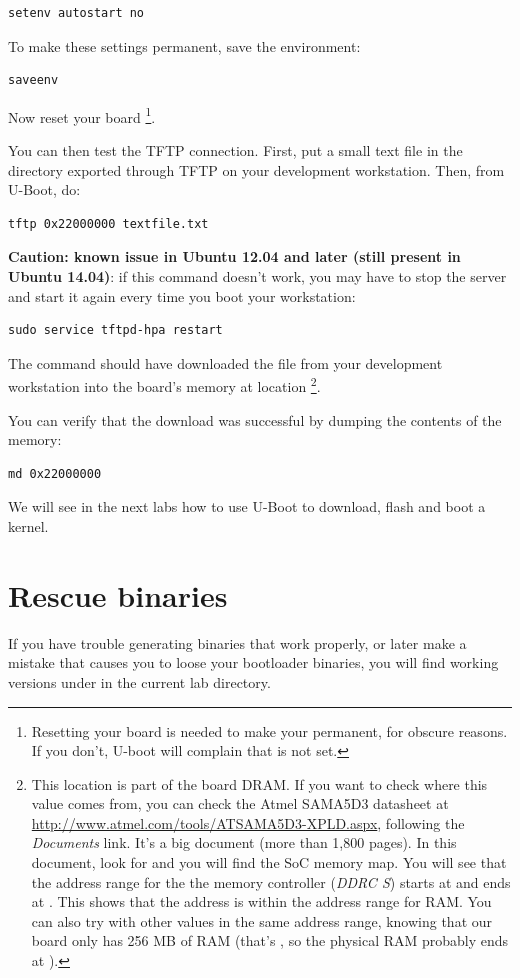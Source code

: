 \begin{verbatim}
setenv autostart no
\end{verbatim}

To make these settings permanent, save the environment:

\begin{verbatim}
saveenv
\end{verbatim}

Now reset your board \footnote{Resetting your board is needed to
make your  permanent, for obscure reasons. If you
don't, U-boot will complain that  is not
set.}.

You can then test the TFTP connection. First, put a small text file in
the directory exported through TFTP on your development
workstation. Then, from U-Boot, do:

\begin{verbatim}
tftp 0x22000000 textfile.txt
\end{verbatim}

{\bf Caution: known issue in Ubuntu 12.04 and later (still present
in Ubuntu 14.04)}: if this command doesn't work, you may have to
stop the server and start it again every time you boot your
workstation:

\begin{verbatim}
sudo service tftpd-hpa restart
\end{verbatim}

The  command should have downloaded
the  file from your development
workstation into the board's memory at location 
\footnote{This location is part of the board DRAM. If you want
to check where this value comes from, you can check the Atmel SAMA5D3
datasheet at \url{http://www.atmel.com/tools/ATSAMA5D3-XPLD.aspx}, 
following the {\em Documents} link. It's a big document (more than 1,800
pages). In this document, look for  and you
will find the SoC memory map. You will see that the address range for
the the memory controller ({\em DDRC S}) starts at 
and ends at . This shows that the  
address is within the address range for RAM. You can also try with other
values in the same address range, knowing that our board only has 256 MB
of RAM (that's , so the physical RAM probably ends at
).}.

You can verify that the download was successful by dumping the
contents of the memory:

\begin{verbatim}
md 0x22000000
\end{verbatim}

We will see in the next labs how to use U-Boot to download, flash and
boot a kernel.

\section{Rescue binaries}

If you have trouble generating binaries that work properly, or later
make a mistake that causes you to loose your bootloader binaries, you
will find working versions under  in the current lab
directory.
